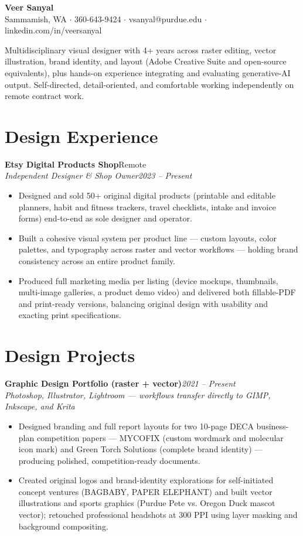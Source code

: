 \documentclass[10pt,letterpaper]{article}
\newcommand{\entry}[4]{%
  \textbf{#1}\hfill #2\\[1pt]
  \textit{#3}\hfill \textit{#4}\\[2pt]
}
\begin{document}
\begin{center}
  {\LARGE \textbf{Veer Sanyal}}\\[3pt]
  Sammamish, WA $\cdot$ 360-643-9424 $\cdot$ vsanyal@purdue.edu $\cdot$ linkedin.com/in/veersanyal
\end{center}

\vspace{2pt}
Multidisciplinary visual designer with 4+ years across raster editing, vector illustration, brand identity, and layout (Adobe Creative Suite and open-source equivalents), plus hands-on experience integrating and evaluating generative-AI output. Self-directed, detail-oriented, and comfortable working independently on remote contract work.

\section*{Design Experience}
\entry{Etsy Digital Products Shop}{Remote}{Independent Designer \& Shop Owner}{2023 -- Present}
\begin{itemize}
  \item Designed and sold 50+ original digital products (printable and editable planners, habit and fitness trackers, travel checklists, intake and invoice forms) end-to-end as sole designer and operator.
  \item Built a cohesive visual system per product line --- custom layouts, color palettes, and typography across raster and vector workflows --- holding brand consistency across an entire product family.
  \item Produced full marketing media per listing (device mockups, thumbnails, multi-image galleries, a product demo video) and delivered both fillable-PDF and print-ready versions, balancing original design with usability and exacting print specifications.
\end{itemize}

\section*{Design Projects}
\textbf{Graphic Design Portfolio (raster + vector)}\hfill \textit{2021 -- Present}\\[1pt]
\textit{Photoshop, Illustrator, Lightroom --- workflows transfer directly to GIMP, Inkscape, and Krita}
\begin{itemize}
  \item Designed branding and full report layouts for two 10-page DECA business-plan competition papers --- MYCOFIX (custom wordmark and molecular icon mark) and Green Torch Solutions (complete brand identity) --- producing polished, competition-ready documents.
  \item Created original logos and brand-identity explorations for self-initiated concept ventures (BAGBABY, PAPER ELEPHANT) and built vector illustrations and sports graphics (Purdue Pete vs. Oregon Duck mascot vector); retouched professional headshots at 300 PPI using layer masking and background compositing.
\end{itemize}
\end{document}
